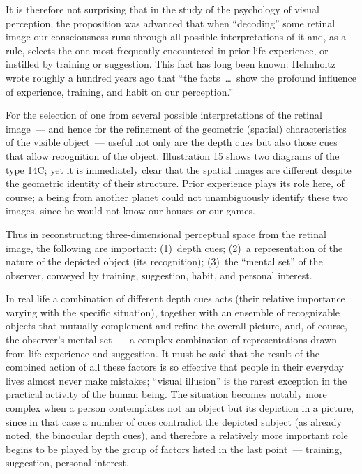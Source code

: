 

It is therefore not surprising that in the study of the psychology of visual perception,
the proposition was advanced that when ``decoding'' some retinal image our
consciousness runs through all possible interpretations of it and, as a rule, selects the
one most frequently encountered in prior life experience, or instilled by training or
suggestion.  This fact has long been known: Helmholtz wrote roughly a hundred years
ago that ``the facts~\ldots\ show the profound influence of experience, training, and
habit on our perception.''

For the selection of one from several possible interpretations of the retinal image~---
and hence for the refinement of the geometric (spatial) characteristics of the visible
object~--- useful not only are the depth cues but also those cues that allow recognition
of the object.  Illustration 15 shows two diagrams of the type 14C; yet it is immediately
clear that the spatial images are different despite the geometric identity of their
structure.  Prior experience plays its role here, of course; a being from another planet
could not unambiguously identify these two images, since he would not know our houses
or our games.

Thus in reconstructing three-dimensional perceptual space from the retinal image, the
following are important:
(1)~depth cues;
(2)~a representation of the nature of the depicted object (its recognition);
(3)~the ``mental set'' of the observer, conveyed by training, suggestion, habit, and
personal interest.

In real life a combination of different depth cues acts (their relative importance varying
with the specific situation), together with an ensemble of recognizable objects that
mutually complement and refine the overall picture, and, of course, the observer's
mental set~--- a complex combination of representations drawn from life experience and
suggestion.  It must be said that the result of the combined action of all these factors is
so effective that people in their everyday lives almost never make mistakes; ``visual
illusion'' is the rarest exception in the practical activity of the human being.  The
situation becomes notably more complex when a person contemplates not an object but
its depiction in a picture, since in that case a number of cues contradict the depicted
subject (as already noted, the binocular depth cues), and therefore a relatively more
important role begins to be played by the group of factors listed in the last point~---
training, suggestion, personal interest.

